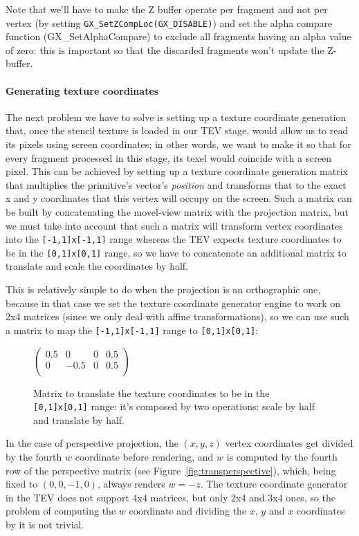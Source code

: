 \documentclass[12pt]{article}
\newcommand{\fname}[1] {{\color{blue}#1}}
\begin{document}
Note that we'll have to make the Z buffer operate per fragment and not per vertex (by setting \lstinline{GX_SetZCompLoc(GX_DISABLE)}) and set the alpha compare function (\fname{GX\_SetAlphaCompare}) to exclude all fragments having an alpha value of zero: this is important so that the discarded fragments won't update the Z-buffer.

\paragraph{Generating texture coordinates}

The next problem we have to solve is setting up a texture coordinate generation that, once the stencil texture is loaded in our TEV stage, would allow us to read its pixels using screen coordinates; in other words, we want to make it so that for every fragment processed in this stage, its texel would coincide with a screen pixel. This can be achieved by setting up a texture coordinate generation matrix that multiplies the primitive's vector's \emph{position} and transforms that to the exact x and y coordinates that this vertex will occupy on the screen. Such a matrix can be built by concatenating the movel-view matrix with the projection matrix, but we must take into account that such a matrix will transform vertex coordinates into the \lstinline{[-1,1]x[-1,1]} range whereas the TEV expects texture coordinates to be in the \lstinline{[0,1]x[0,1]} range, so we have to concatenate an additional matrix to translate and scale the coordinates by half.

This is relatively simple to do when the projection is an orthographic one, because in that case we set the texture coordinate generator engine to work on 2x4 matrices (since we only deal with affine transformations), so we can use such a matrix to map the \lstinline{[-1,1]x[-1,1]} range to \lstinline{[0,1]x[0,1]}:

\begin{figure}[ht]
\centering
$ \begin{pmatrix}
	0.5 & 0    & 0 & 0.5\\
	0   & -0.5 & 0 & 0.5\\
\end{pmatrix} $
\caption{Matrix to translate the texture coordinates to be in the \lstinline{[0,1]x[0,1]} range: it's composed by two operations: scale by half and translate by half.}
\label{fig:transortho}
\end{figure}

In the case of perspective projection, the $(x, y, z)$ vertex coordinates get divided by the fourth $w$ coordinate before rendering, and $w$ is computed by the fourth row of the perspective matrix (see Figure~\ref{fig:transperspective}), which, being fixed to $(0, 0, -1, 0)$, always renders $w = -z$. The texture coordinate generator in the TEV does not support 4x4 matrices, but only 2x4 and 3x4 ones, so the problem of computing the $w$ coordinate and dividing the $x$, $y$ and $x$ coordinates by it is not trivial.
\end{document}
